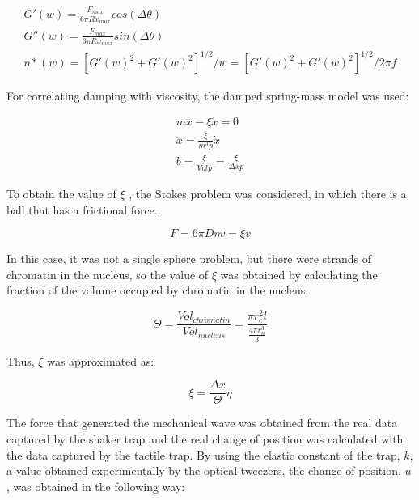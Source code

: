\documentclass[12pt, a4paper]{article} %
\begin{document}
\begin{equation} \label{eqn:microreology}
	\begin{array}{ l }
		
		G'(w) = \frac{F_{max}}{6\pi R x_{max}} cos(\Delta \theta) \\
		G''(w) = \frac{F_{max}}{6\pi R x_{max}} sin(\Delta \theta) \\
		\eta *(w) = [G'(w)^{2}+G'(w)^{2}]^{1/2}/w = [G'(w)^{2}+G'(w)^{2}]^{1/2}/2\pi f
		
	\end{array}
\end{equation}

For correlating damping with viscosity, the damped spring-mass model was used:

\begin{equation} \label{eqn:modelo_masa_resorte}
	\begin{array}{ l }
		
		m\ddot{x} - \xi \dot{x} = 0 \\
		\ddot{x} = \frac{\xi}{m^{3}p}\dot{x} \\
		b = \frac{\xi}{\bar{Vol} p} = \frac{\xi}{\Delta x p}
		
	\end{array}
\end{equation}

To obtain the value of $\xi$ , the Stokes problem was considered, in which there is a ball that has a frictional force..

\begin{equation} \label{eqn:stokes}
	F = 6\pi D \eta v = \xi v
\end{equation}

In this case, it was not a single sphere problem, but there were strands of chromatin in the nucleus, so the value of $\xi$ was obtained by calculating the fraction of the volume occupied by chromatin in the nucleus.

\begin{equation} \label{eqn:frac_nucl_chro}
	\Theta = \frac{Vol_{chromatin}}{Vol_{nucleus}} = \frac{\pi r_{c}^{2} l}{\frac{4\pi r_{n}^{3}}{3}}
\end{equation}

Thus, $\xi$ was approximated as:

\begin{equation} \label{eqn:xi_approx}
	\xi = \frac{\Delta x}{\Theta} \eta
\end{equation}

The force that generated the mechanical wave was obtained from the real data captured by the shaker trap and the real change of position was calculated with the data captured by the tactile trap. By using the elastic constant of the trap, $k$, a value obtained experimentally by the optical tweezers, the change of position, $u$, was obtained in the following way:
\end{document}
